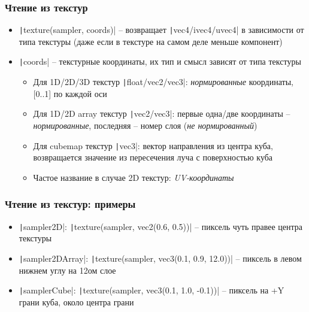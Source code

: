 \documentclass[10pt]{beamer}
\begin{document}
\begin{frame}[fragile]
\frametitle{Чтение из текстур}
\begin{itemize}
\item \texttt|texture(sampler, coords)| -- возвращает \texttt|vec4/ivec4/uvec4| в зависимости от типа текстуры (даже если в текстуре на самом деле меньше компонент)
\pause
\item \texttt|coords| -- текстурные координаты, их тип и смысл зависят от типа текстуры
\pause
\begin{itemize}
\item Для 1D/2D/3D текстур \texttt|float/vec2/vec3|: \textit{нормированные} координаты, [0..1] по каждой оси
\pause
\item Для 1D/2D array текстур \texttt|vec2/vec3|: первые одна/две координаты -- \textit{нормированные}, последняя -- номер слоя (\textit{не нормированный})
\pause
\item Для cubemap текстур \texttt|vec3|: вектор направления из центра куба, возвращается значение из пересечения луча с поверхностью куба
\pause
\item Частое название в случае 2D текстур: \textit{UV-координаты}
\end{itemize}
\end{itemize}
\end{frame}

\begin{frame}[fragile]
\frametitle{Чтение из текстур: примеры}
\begin{itemize}
\item \texttt|sampler2D|: \texttt|texture(sampler, vec2(0.6, 0.5))| -- пиксель чуть правее центра текстуры
\pause
\item \texttt|sampler2DArray|: \texttt|texture(sampler, vec3(0.1, 0.9, 12.0))| -- пиксель в левом нижнем углу на 12ом слое
\pause
\item \texttt|samplerCube|: \texttt|texture(sampler, vec3(0.1, 1.0, -0.1))| -- пиксель на +Y грани куба, около центра грани
\end{itemize}
\end{frame}
\end{document}
